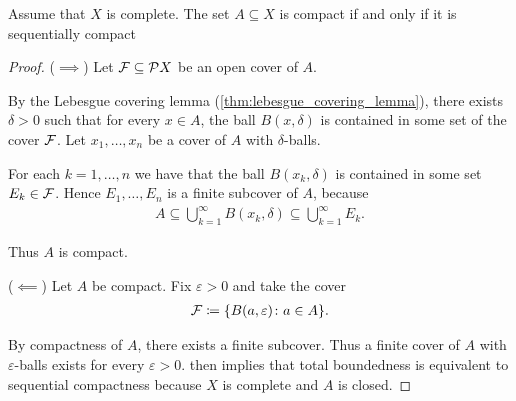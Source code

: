 \begin{theorem}\label{thm:metric_compact_iff_sequentially_compact}
  Assume that $X$ is complete. The set $A \subseteq X$ is compact if and only if it is sequentially compact
\end{theorem}
\begin{proof}
  ($\implies$) Let $\mathcal{F} \subseteq \mathcal{P} X$ be an open cover of $A$.

  By the Lebesgue covering lemma (\cref{thm:lebesgue_covering_lemma}), there exists $\delta > 0$ such that for every $x \in A$, the ball $B(x, \delta)$ is contained in some set of the cover $\mathcal{F}$. Let $x_1, \ldots, x_n$ be a cover of $A$ with $\delta$-balls.

  For each $k = 1, \ldots, n$ we have that the ball $B(x_k, \delta)$ is contained in some set $E_k \in \mathcal{F}$. Hence $E_1, \ldots, E_n$ is a finite subcover of $A$, because
  \begin{align*}
    A \subseteq \bigcup_{k=1}^\infty B(x_k, \delta) \subseteq \bigcup_{k=1}^\infty E_k.
  \end{align*}

  Thus $A$ is compact.

  ($\impliedby$) Let $A$ be compact. Fix $\varepsilon > 0$ and take the cover
  \begin{align*}
    \mathcal{F} \coloneqq \{ B(a, \varepsilon) \colon a \in A \}.
  \end{align*}

  By compactness of $A$, there exists a finite subcover. Thus a finite cover of $A$ with $\varepsilon$-balls exists for every $\varepsilon > 0$.  then implies that total boundedness is equivalent to sequential compactness because $X$ is complete and $A$ is closed.
\end{proof}
